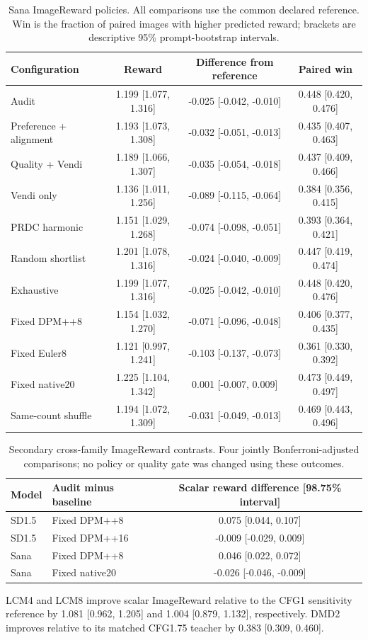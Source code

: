 \begin{table}[t]\centering\small
\caption{Sana ImageReward policies. All comparisons use the common declared reference. Win is the fraction of paired images with higher predicted reward; brackets are descriptive 95\% prompt-bootstrap intervals.}
\begin{tabular}{lccc}\toprule
Configuration & Reward & Difference from reference & Paired win \\\midrule
Audit & 1.199 [1.077, 1.316] & -0.025 [-0.042, -0.010] & 0.448 [0.420, 0.476] \\
Preference + alignment & 1.193 [1.073, 1.308] & -0.032 [-0.051, -0.013] & 0.435 [0.407, 0.463] \\
Quality + Vendi & 1.189 [1.066, 1.307] & -0.035 [-0.054, -0.018] & 0.437 [0.409, 0.466] \\
Vendi only & 1.136 [1.011, 1.256] & -0.089 [-0.115, -0.064] & 0.384 [0.356, 0.415] \\
PRDC harmonic & 1.151 [1.029, 1.268] & -0.074 [-0.098, -0.051] & 0.393 [0.364, 0.421] \\
Random shortlist & 1.201 [1.078, 1.316] & -0.024 [-0.040, -0.009] & 0.447 [0.419, 0.474] \\
Exhaustive & 1.199 [1.077, 1.316] & -0.025 [-0.042, -0.010] & 0.448 [0.420, 0.476] \\
Fixed DPM++8 & 1.154 [1.032, 1.270] & -0.071 [-0.096, -0.048] & 0.406 [0.377, 0.435] \\
Fixed Euler8 & 1.121 [0.997, 1.241] & -0.103 [-0.137, -0.073] & 0.361 [0.330, 0.392] \\
Fixed native20 & 1.225 [1.104, 1.342] & 0.001 [-0.007, 0.009] & 0.473 [0.449, 0.497] \\
Same-count shuffle & 1.194 [1.072, 1.309] & -0.031 [-0.049, -0.013] & 0.469 [0.443, 0.496] \\
\bottomrule\end{tabular}\end{table}
\begin{table}[t]\centering\small
\caption{Secondary cross-family ImageReward contrasts. Four jointly Bonferroni-adjusted comparisons; no policy or quality gate was changed using these outcomes.}
\begin{tabular}{llc}\toprule
Model & Audit minus baseline & Scalar reward difference [98.75\% interval] \\\midrule
SD1.5 & Fixed DPM++8 & 0.075 [0.044, 0.107] \\
SD1.5 & Fixed DPM++16 & -0.009 [-0.029, 0.009] \\
Sana & Fixed DPM++8 & 0.046 [0.022, 0.072] \\
Sana & Fixed native20 & -0.026 [-0.046, -0.009] \\
\bottomrule\end{tabular}\end{table}
LCM4 and LCM8 improve scalar ImageReward relative to the CFG1 sensitivity
reference by 1.081 [0.962, 1.205] and 1.004 [0.879, 1.132], respectively.
DMD2 improves relative to its matched CFG1.75 teacher by 0.383 [0.309, 0.460].
